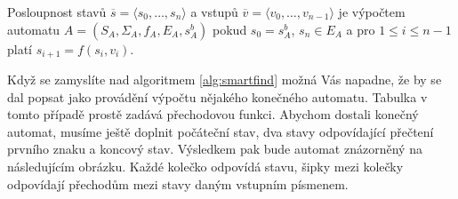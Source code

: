 \begin{definition} \label{def:vypocet}
Posloupnost stavů \(\overline{s}=\langle s_0,\ldots, s_n\rangle\)
a vstupů \(\overline{v}=\langle v_0,\ldots, v_{n-1}\rangle\) je výpočtem automatu 
\(A=(S_A,\Sigma_A,f_A, E_A,s_A^b)\) pokud \(s_0=s_A^b\), \(s_n\in E_A\) a pro \(1\leq i\leq n-1\) 
platí \(s_{i+1} = f(s_i,v_i)\).
\end{definition}

Když se zamyslíte nad algoritmem \ref{alg:smartfind} možná Vás napadne, že by se dal
popsat jako provádění výpočtu nějakého konečného automatu. Tabulka v tomto případě
prostě zadává přechodovou funkci.  Abychom dostali konečný automat, musíme ještě
doplnit počáteční stav, dva stavy odpovídající přečtení prvního znaku a koncový stav.
Výsledkem pak bude automat znázorněný na následujícím obrázku. Každé kolečko odpovídá
stavu, šipky mezi kolečky odpovídají přechodům mezi stavy daným vstupním písmenem.

